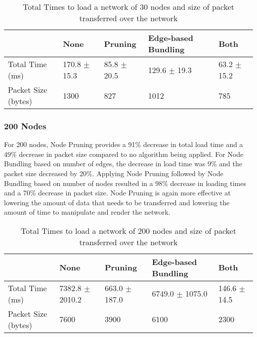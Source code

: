 \documentclass[../dissertation.tex]{subfiles}
\begin{document}
\begin{table}[H]
\centering
\begin{tabular}{|l|l|l|l|l|}
\hline
                    & \textbf{None}    & \textbf{Pruning} & \textbf{Edge-based Bundling}    & \textbf{Both}   \\ \hline
Total Time (ms)     & 170.8 $\pm$ 15.3 & 85.8 $\pm$ 20.5  & 129.6 $\pm$ 19.3 & 63.2 $\pm$ 15.2 \\ \hline
Packet Size (bytes) & 1300             & 827              & 1012             & 785             \\ \hline
\end{tabular}
\caption{Total Times to load a network of 30 nodes and size of packet transferred over the network}
\label{table:30-nodes}
\end{table}

\subsubsection{200 Nodes}

For 200 nodes, Node Pruning provides a 91\% decrease in total load time and a 49\% decrease in packet size compared to no algorithm being applied. For Node Bundling based on number of edges, the decrease in load time was 9\% and the packet size decreased by 20\%. Applying Node Pruning followed by Node Bundling based on number of nodes resulted in a 98\% decrease in loading times and a 70\% decrease in packet size. Node Pruning is again more effective at lowering the amount of data that needs to be transferred and lowering the amount of time to manipulate and render the network.

\begin{table}[H]
\centering
\begin{tabular}{|l|l|l|l|l|}
\hline
                    & \textbf{None}       & \textbf{Pruning}  & \textbf{Edge-based Bundling}       & \textbf{Both}    \\ \hline
Total Time (ms)     & 7382.8 $\pm$ 2010.2 & 663.0 $\pm$ 187.0 & 6749.0 $\pm$ 1075.0 & 146.6 $\pm$ 14.5 \\ \hline
Packet Size (bytes) & 7600                & 3900              & 6100                & 2300             \\ \hline
\end{tabular}
\caption{Total Times to load a network of 200 nodes and size of packet transferred over the network}
\label{table:200-nodes}
\end{table}
\end{document}
